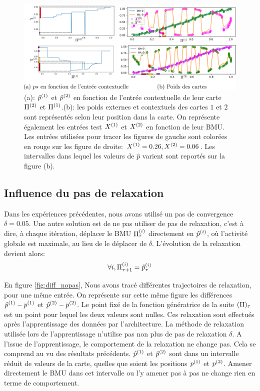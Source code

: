 \documentclass[../main]{subfiles}
\begin{document}
\begin{figure}
	\includegraphics[width=\textwidth]{am_w_006}
	\caption{(a): $\hat{p}^{({1})}$ et $\hat{p}^{({2})}$ en fonction de l'entrée contextuelle de leur carte $\Pi^{({2})}$ et $\Pi^{({1})}$.(b): les poids externes et contextuels des cartes $1$ et $2$ sont représentés selon leur position dans la carte. On représente également les entrées test $X^{({1})}$ et $X^{({2})}$ en fonction de leur BMU. Les entrées utilisées pour tracer les figures de gauche sont colorées en rouge sur les figure de droite: $X^{({1})}=0.26,X^{({2})}=0.06$. Les intervalles dans lequel les valeurs de $\hat{p}$ varient sont reportés sur la figure (b).}
	\label{fig:w006}
	\end{figure}

\subsection{Influence du pas de relaxation}

Dans les expériences précédentes, nous avons utilisé un pas de convergence $\delta=0.05$.
Une autre solution est de ne pas utiliser de pas de relaxation, c'est à dire, à chaque itération, déplacer le BMU $\Pi^{({i})}_\tau$ directement en $\hat{p}^{({i})}$, où l'activité globale est maximale, au lieu de le déplacer de $\delta$.
L'évolution de la relaxation devient alors:
\begin{equation}
\forall i, \Pi^{({i})}_{\tau+1} = \hat{p}^{({i})}_{\tau}
\end{equation}

En figure \ref{fig:diff_nopas}, Nous avons tracé différentes trajectoires de relaxation, pour une même entrée. 
On représente sur cette même figure les différences ${\hat{p}}^{({1})} - p^{({1})}$ et ${\hat{p}}^{({2})} - p^{({2})}$. Le point fixé de la fonction génératrice de la suite $(\Pi)_\tau$ est un point pour lequel les deux valeurs sont nulles.
Ces relaxation sont effectués après l'apprentissage des données par l'architecture. La méthode de relaxation utilisée lors de l'apprentissage n'utilise pas non plus de pas de relaxation $\delta$.
A l'issue de l'apprentissage, le comportement de la relaxation ne change pas. 
Cela se comprend au vu des résultats précédents. $\hat{p}^{({1})}$ et $\hat{p}^{({2})}$ sont dans un intervalle réduit de valeurs de la carte, quelles que soient les positions $p^{({1})}$ et $p^{({2})}$. Amener directement le BMU dans cet intervalle ou l'y amener pas à pas ne change rien en terme de comportement. 
\end{document}
